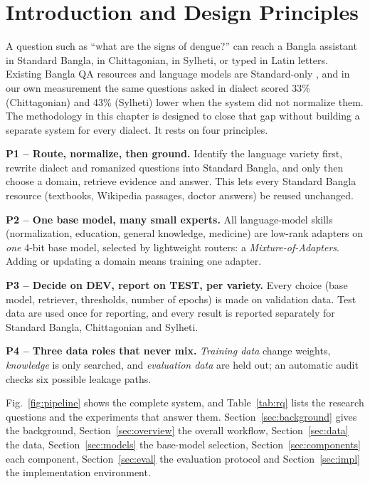 \section{Introduction and Design Principles}
\label{sec:intro}

A question such as ``what are the signs of dengue?'' can reach a Bangla assistant in Standard Bangla, in Chittagonian, in Sylheti, or typed in Latin letters. Existing Bangla QA resources and language models are Standard-only \cite{ekram2022banglarqa,nctbqa,raihan2025tigerllm}, and in our own measurement the same questions asked in dialect scored 33\% (Chittagonian) and 43\% (Sylheti) lower when the system did not normalize them. The methodology in this chapter is designed to close that gap without building a separate system for every dialect. It rests on four principles.

\textbf{P1 -- Route, normalize, then ground.} Identify the language variety first, rewrite dialect and romanized questions into Standard Bangla, and only then choose a domain, retrieve evidence and answer. This lets every Standard Bangla resource (textbooks, Wikipedia passages, doctor answers) be reused unchanged.

\textbf{P2 -- One base model, many small experts.} All language-model skills (normalization, education, general knowledge, medicine) are low-rank adapters on \emph{one} 4-bit base model, selected by lightweight routers: a \emph{Mixture-of-Adapters}. Adding or updating a domain means training one adapter.

\textbf{P3 -- Decide on DEV, report on TEST, per variety.} Every choice (base model, retriever, thresholds, number of epochs) is made on validation data. Test data are used once for reporting, and every result is reported separately for Standard Bangla, Chittagonian and Sylheti.

\textbf{P4 -- Three data roles that never mix.} \emph{Training data} change weights, \emph{knowledge} is only searched, and \emph{evaluation data} are held out; an automatic audit checks six possible leakage paths.

Fig.~\ref{fig:pipeline} shows the complete system, and Table~\ref{tab:rq} lists the research questions and the experiments that answer them. Section~\ref{sec:background} gives the background, Section~\ref{sec:overview} the overall workflow, Section~\ref{sec:data} the data, Section~\ref{sec:models} the base-model selection, Section~\ref{sec:components} each component, Section~\ref{sec:eval} the evaluation protocol and Section~\ref{sec:impl} the implementation environment.

